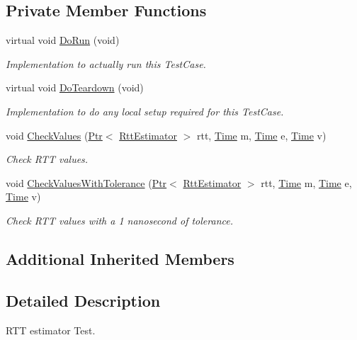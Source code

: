 \subsection*{Private Member Functions}
\begin{DoxyCompactItemize}
\item 
virtual void \hyperlink{classRttEstimatorTestCase_a0f7b32f862450cf750923c9be8ec0918}{Do\+Run} (void)
\begin{DoxyCompactList}\small\item\em Implementation to actually run this Test\+Case. \end{DoxyCompactList}\item 
virtual void \hyperlink{classRttEstimatorTestCase_a145559d586ddbefe51bc36c4625c6bdb}{Do\+Teardown} (void)
\begin{DoxyCompactList}\small\item\em Implementation to do any local setup required for this Test\+Case. \end{DoxyCompactList}\item 
void \hyperlink{classRttEstimatorTestCase_ac867e75a325f327d4efbcd97bc1f7365}{Check\+Values} (\hyperlink{classns3_1_1Ptr}{Ptr}$<$ \hyperlink{classns3_1_1RttEstimator}{Rtt\+Estimator} $>$ rtt, \hyperlink{classns3_1_1Time}{Time} m, \hyperlink{classns3_1_1Time}{Time} e, \hyperlink{classns3_1_1Time}{Time} v)
\begin{DoxyCompactList}\small\item\em Check R\+TT values. \end{DoxyCompactList}\item 
void \hyperlink{classRttEstimatorTestCase_a9ac2c6a3481c9f02178235ec1ef68b66}{Check\+Values\+With\+Tolerance} (\hyperlink{classns3_1_1Ptr}{Ptr}$<$ \hyperlink{classns3_1_1RttEstimator}{Rtt\+Estimator} $>$ rtt, \hyperlink{classns3_1_1Time}{Time} m, \hyperlink{classns3_1_1Time}{Time} e, \hyperlink{classns3_1_1Time}{Time} v)
\begin{DoxyCompactList}\small\item\em Check R\+TT values with a 1 nanosecond of tolerance. \end{DoxyCompactList}\end{DoxyCompactItemize}
\subsection*{Additional Inherited Members}


\subsection{Detailed Description}
R\+TT estimator Test. 

